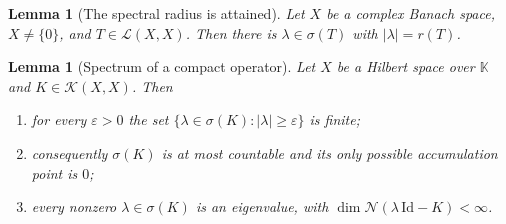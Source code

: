 \documentclass[a4paper]{report}
\theoremstyle{plain}
\newtheorem{lemma}[theorem]{Lemma}
\theoremstyle{definition}
\theoremstyle{remark}
\begin{document}
\begin{lemma}[The spectral radius is attained]
  \label{lem_spectral_radius_attained}
  Let $X$ be a complex Banach space, $X \ne \{0\}$, and $T \in \mathcal{L}(X,X)$.  Then
  there is $\lambda \in \sigma(T)$ with $|\lambda| = r(T)$.
\end{lemma}


\begin{lemma}[Spectrum of a compact operator]
  \label{lem_eigenvalue_null}
  Let $X$ be a Hilbert space over $\mathbb{K}$ and $K \in \mathcal{K}(X,X)$.  Then
  \begin{enumerate}
    \item for every $\varepsilon > 0$ the set
      $\{\lambda \in \sigma(K) : |\lambda| \ge \varepsilon\}$ is \emph{finite};
    \item consequently $\sigma(K)$ is at most countable and its only possible accumulation
      point is $0$;
    \item every nonzero $\lambda \in \sigma(K)$ is an eigenvalue, with
      $\dim\mathcal{N}(\lambda\,\mathrm{Id}-K) < \infty$.
  \end{enumerate}
\end{lemma}
\end{document}
